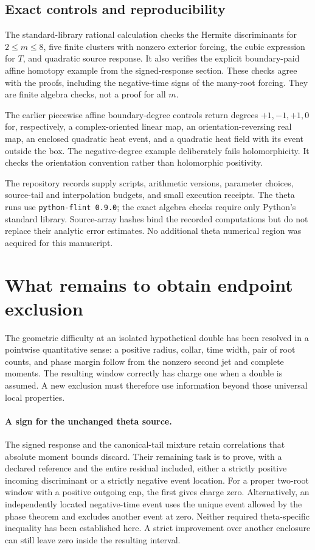 \subsection{Exact controls and reproducibility}

The standard-library rational calculation \cite{controls} checks the
Hermite discriminants for $2\leq m\leq8$, five finite clusters with
nonzero exterior forcing, the cubic expression for $T$, and quadratic
source response. It also verifies the explicit boundary-paid affine
homotopy example from the signed-response section. These checks agree
with the proofs, including the negative-time signs of the many-root
forcing. They are finite algebra checks, not a proof for all $m$.

The earlier piecewise affine boundary-degree controls \cite{note02}
return degrees $+1,-1,+1,0$ for, respectively, a complex-oriented
linear map, an orientation-reversing real map, an enclosed quadratic
heat event, and a quadratic heat field with its event outside the box.
The negative-degree example deliberately fails holomorphicity. It
checks the orientation convention rather than holomorphic positivity.

The repository records supply scripts, arithmetic versions, parameter
choices, source-tail and interpolation budgets, and small execution
receipts. The theta runs use \texttt{python-flint 0.9.0}; the exact
algebra checks require only Python's standard library. Source-array
hashes bind the recorded computations but do not replace their
analytic error estimates. No additional theta numerical region was
acquired for this manuscript.

\section{What remains to obtain endpoint exclusion}
\label{sec:open}

The geometric difficulty at an isolated hypothetical double has been
resolved in a pointwise quantitative sense: a positive radius, collar,
time width, pair of root counts, and phase margin follow from the
nonzero second jet and complete moments. The resulting window correctly
has charge one when a double is assumed. A new exclusion must therefore
use information beyond those universal local properties.

\paragraph{A sign for the unchanged theta source.}
The signed response and the canonical-tail mixture retain correlations
that absolute moment bounds discard. Their remaining task is to prove,
with a declared reference and the entire residual included, either a
strictly positive incoming discriminant or a strictly negative event
location. For a proper two-root window with a positive outgoing cap,
the first gives charge zero. Alternatively, an independently located
negative-time event uses the unique event allowed by the phase theorem
and excludes another event at zero. Neither required theta-specific
inequality has been established here. A strict improvement over another
enclosure can still leave zero inside the resulting interval.

